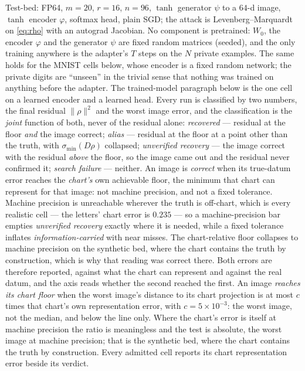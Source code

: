 Test-bed: FP64, $m=20$, $r=16$, $n=96$, $\tanh$ generator $\psi$ to a $64$-d
image, $\tanh$ encoder $\varphi$, softmax head, plain SGD; the attack is
Levenberg--Marquardt on \eqref{eq:rho} with an autograd Jacobian. No
component is pretrained: $W_0$, the encoder $\varphi$ and the generator
$\psi$ are fixed random matrices (seeded), and the only training anywhere is
the adapter's $T$ steps on the $N$ private examples. The same holds for the
MNIST cells below, whose encoder is a fixed random network; the private
digits are ``unseen'' in the trivial sense that nothing was trained on
anything before the adapter. The trained-model paragraph below is the one cell on a learned encoder
and a learned head. Every run is
classified by two numbers, the final residual $\|\rho\|^2$ and the worst
image error, and the classification is the \emph{joint} function of both,
never of the residual alone: \emph{recovered} — residual at the floor
\emph{and} the image correct; \emph{alias} — residual at the floor at
a point other than the truth, with $\sigma_{\min}(D\rho)$ collapsed;
\emph{unverified recovery} — the image correct with the residual
\emph{above} the floor, so the image came out and the residual never confirmed
it; \emph{search failure} — neither.
An image is \emph{correct} when its true-datum error reaches the \emph{chart's}
own achievable floor, the minimum that chart can represent for that image: not
machine precision, and not a fixed tolerance. Machine precision is unreachable
wherever the truth is off-chart, which is every realistic cell — the letters'
chart error is $0.235$ — so a machine-precision bar empties \emph{unverified
recovery} exactly where it is needed, while a fixed tolerance inflates
\emph{information-carried} with near misses. The chart-relative floor collapses
to machine precision on the synthetic bed, where the chart contains the truth by
construction, which is why that reading was correct there. Both errors are
therefore reported, against what the chart can represent and against the real
datum, and the axis reads whether the second reached the first.
An image \emph{reaches its chart floor} when the worst image's distance to its
chart projection is at most $c$ times that chart's own representation error,
with $c=5\times10^{-3}$: the worst image, not the median, and below the line
only. Where the chart's error is itself at machine precision the ratio is
meaningless and the test is absolute, the worst image at machine precision;
that is the synthetic bed, where the chart contains the truth by construction.
Every admitted cell reports its chart representation error beside its verdict.
